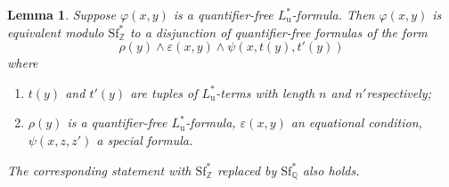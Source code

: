 \documentclass[letterpaper]{amsart}
\newcommand{\qq}{\mathbb{Q}}
\newcommand{\zz}{\mathbb{Z}}
\newcommand{\sU}{\mathscr{U}}
\newcommand{\sP}{\mathscr{P}}
\newcommand{\WSFZ}{\mathrm{Sf}^*_{\zz}}
\newcommand{\WSFQ}{\mathrm{Sf}^*_{\qq}}
\newtheorem{lem}[thm]{Lemma}
\begin{document}
\begin{lem}\label{SimplifytoG}
Suppose $\varphi(x,y)$ is a quantifier-free $L^*_{\mathrm{u}}$-formula. Then $\varphi(x,y)$ is  equivalent modulo $\WSFZ$ to a disjunction of quantifier-free formulas of the form
$$  \rho(y) \wedge \varepsilon(x, y)  \wedge \psi(x, t(y), t'(y))  $$
where
\begin{enumerate}
\item[$\mathrm{(i)}$] $t(y)$ and $t'(y)$ are tuples of $L^*_{\mathrm{u}}$-terms with length $n$ and $n'$respectively;
\item[$\mathrm{(ii)}$] $\rho(y)$ is a quantifier-free $L^*_{\mathrm{u}}$-formula, $ \varepsilon(x, y)$ an equational condition, $\psi(x, z, z')$ a special formula.
\end{enumerate}
The corresponding statement with $\WSFZ$ replaced by $\WSFQ$ also holds.
\begin{comment}
Suppose $(G; \sU^G, \sP^G)$ is a $L^*_{\mathrm{u}}$-substructure of a model of either  $\WSFZ$ or $\WSFQ$, $\varphi(x, y)$ is a quantifier-free $L^*_{\mathrm{u}}$-formula, and $b$ is in $M_y$. Then across $\WSFZ$-models and $\WSFQ$-models  extending $(G; \sU^G, \sP^G)$ as $L^*_{\mathrm{u}}$-structures, $\varphi(x, b)$ is equivalent to a disjunction of $L^*_{\mathrm{u}}(G)$-formulas  of the form 
$$  \rho(b) \wedge \varepsilon(x, b') \wedge \psi(x, c, c') $$
where
\begin{enumerate}
\item $\rho(y)$ is a quantifier-free $L^*_{\mathrm{u}}$-formula, $ \varepsilon(x, y')$ an equational-condition, $\psi(x, z, z')$ a special formula
 \item $b \in G_{y'}$, $c \in G_{z}$, and $c' \in G_{z'}$ have components $\zz$-linear combinations of the components of $b$
 \end{enumerate}
\end{comment}
\end{lem}
\end{document}
